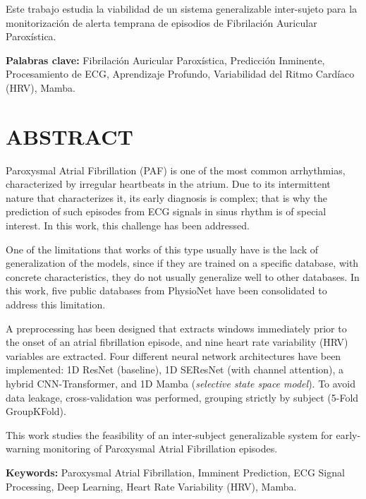 Este trabajo estudia la viabilidad de un sistema generalizable inter-sujeto
para la monitorización de alerta temprana de episodios de Fibrilación Auricular Paroxística.

\vspace{0.8cm}
\noindent\textbf{Palabras clave:} Fibrilación Auricular Paroxística, Predicción Inminente, Procesamiento de ECG, Aprendizaje Profundo, Variabilidad del Ritmo Cardíaco (HRV), Mamba.

\vspace{1cm}

\section*{ABSTRACT}

Paroxysmal Atrial Fibrillation (PAF) is one of the most common arrhythmias, characterized by irregular heartbeats in the atrium. Due to its intermittent nature that characterizes it, its early diagnosis is complex; that is why the prediction of such episodes from ECG signals in sinus rhythm is of special interest. In this work, this challenge has been addressed.

One of the limitations that works of this type usually have is the lack of generalization of the models, since if they are trained on a specific database, with concrete characteristics, they do not usually generalize well to other databases. In this work, five public databases from PhysioNet have been consolidated to address this limitation.

A preprocessing has been designed that extracts windows immediately prior to the onset of an atrial fibrillation episode, and nine heart rate variability (HRV) variables are extracted. Four different neural network architectures have been implemented: 1D ResNet (baseline), 1D SEResNet (with channel attention), a hybrid CNN-Transformer, and 1D Mamba (\textit{selective state space model}). To avoid data leakage, cross-validation was performed, grouping strictly by subject (5-Fold GroupKFold).

This work studies the feasibility of an inter-subject generalizable system for early-warning monitoring of Paroxysmal Atrial Fibrillation episodes.

\vspace{0.8cm}
\noindent\textbf{Keywords:} Paroxysmal Atrial Fibrillation, Imminent Prediction, ECG Signal Processing, Deep Learning, Heart Rate Variability (HRV), Mamba.



